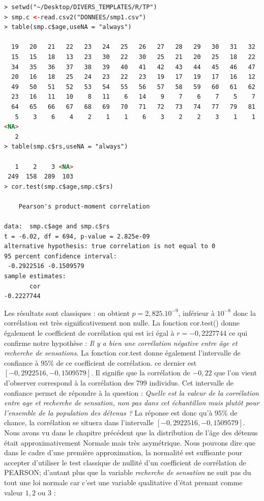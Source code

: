 \begin{lstlisting}[language=html]
> setwd("~/Desktop/DIVERS_TEMPLATES/R/TP")
> smp.c <-read.csv2("DONNEES/smp1.csv")
> table(smp.c$age,useNA = "always")

  19   20   21   22   23   24   25   26   27   28   29   30   31   32   33 
  15   15   18   13   23   30   22   30   25   21   20   25   18   22   26 
  34   35   36   37   38   39   40   41   42   43   44   45   46   47   48 
  20   16   18   25   24   23   22   23   19   17   19   17   16   12   17 
  49   50   51   52   53   54   55   56   57   58   59   60   61   62   63 
  23   16   11   10    8   11    6   14    9    7    6    7    5    7    4 
  64   65   66   67   68   69   70   71   72   73   74   77   79   81   83 
   5    3    6    4    2    1    1    6    3    2    2    3    1    1    2 
<NA> 
   2 
> table(smp.c$rs,useNA = "always")

   1    2    3 <NA> 
 249  158  289  103 
> cor.test(smp.c$age,smp.c$rs)

	Pearson's product-moment correlation

data:  smp.c$age and smp.c$rs
t = -6.02, df = 694, p-value = 2.825e-09
alternative hypothesis: true correlation is not equal to 0
95 percent confidence interval:
 -0.2922516 -0.1509579
sample estimates:
       cor 
-0.2227744 
\end{lstlisting}
Les résultats sont classiques : on obtient $p= 2,825.10^{-9}$, inférieur à $10^{-8}$ donc la corrélation est très significativement non nulle. La fonction cor.test() donne également le coefficient de corrélation qui est ici égal à $r=-0,2227744$ ce qui confirme notre hypothèse : \textit{Il y a bien une corrélation négative entre âge et recherche de sensations}.\newline
La fonction cor.test donne également l'intervalle de confiance à $95\%$ de ce coefficient de corrélation. ce dernier est $[-0,2922516, -0,1509579]$. Il signifie que la corrélation de $-0,22$ que l'on vient d'observer correspond à la corrélation des 799 individus. Cet intervalle de confiance permet de répondre à la question : \textit{Quelle est la valeur de la corrélation entre age et recherche de sensation, non pas dans cet échantillon mais plutôt pour l'ensemble de la population des détenus ?} La réponse est donc qu'à $95\%$ de chance, la corrélation se situera dans l'intervalle $[-0,2922516, -0,1509579]$.\newline
\\
Nous avons vu dans le chapitre précédent que la distribution de l'âge des détenus était approximativement Normale mais très asymétrique. Nous pouvons dire que dans le cadre d'une première approximation, la normalité est suffisante pour accepter d'utiliser le test classique de nullité d'un coefficient de corrélation de PEARSON; d'autant plus que la variable \textit{recherche de sensation} ne suit pas du tout une loi normale car c'est une variable qualitative d'état prenant comme valeur $1,2$ ou $3$ :
